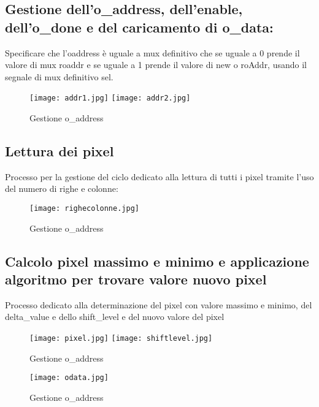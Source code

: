 \documentclass[12pt, table, xcdraw]{article}
\begin{document}
\begin{changemargin}{-3cm}{-1cm}
\begin{tikzpicture}[->,>=stealth',shorten >=1pt,auto,node distance=3cm,
        scale = 1,transform shape]
\end{tikzpicture}
\end{changemargin}

\subsection{Gestione dell'o\_address, dell'enable, dell'o\_done e del caricamento di o\_data:}

Specificare che l'oaddress è uguale a mux definitivo che se uguale a 0 prende il valore di mux roaddr e se uguale a 1 prende il valore di new o roAddr, usando il segnale di mux definitivo sel.

\begin{figure}[h!]
  \texttt{[image: addr1.jpg]}
   \texttt{[image: addr2.jpg]}
  \caption{Gestione o\_address}
  \label{fig:boat1}
\end{figure}
\FloatBarrier

\subsection{Lettura dei pixel}
Processo per la gestione del ciclo dedicato alla lettura di tutti i pixel tramite l'uso del numero di righe e colonne:

\begin{figure}[h!]
  \texttt{[image: righecolonne.jpg]}
  \caption{Gestione o\_address}
  \label{fig:boat1}
\end{figure}
\FloatBarrier
\newpage
\subsection{Calcolo pixel massimo e minimo e applicazione algoritmo per trovare valore nuovo pixel}
Processo dedicato alla determinazione del pixel con valore massimo e minimo, del delta\_value e dello shift\_level e del nuovo valore del pixel




\begin{figure}[h!]
\hspace*{-1.1in}
  \texttt{[image: pixel.jpg]}
 \texttt{[image: shiftlevel.jpg]}
  \caption{Gestione o\_address}
  \label{fig:boat1}
\end{figure}


\newpage
\begin{figure}[h!]
  \texttt{[image: odata.jpg]}
  \caption{Gestione o\_address}
  \label{fig:boat1}
\end{figure}
\FloatBarrier
\end{document}
